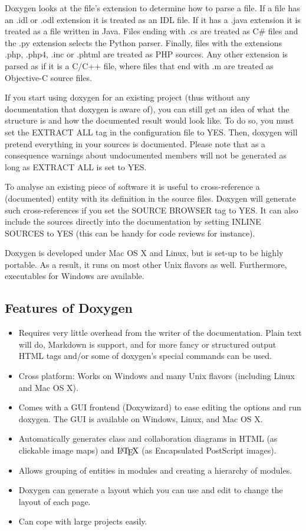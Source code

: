 Doxygen looks at the file’s extension to determine how to parse a file. If a file has an .idl or .odl extension it is treated as an IDL file. If it has a .java extension it is treated as a file written in Java. Files ending with .cs are treated as C\# files and the .py extension selects the Python parser. Finally, files with the extensions .php, .php4, .inc or .phtml are treated as PHP sources. Any other extension is parsed as if it is a C/C++ file, where files that end with .m are treated as Objective-C source files.

If you start using doxygen for an existing project (thus without any documentation that doxygen is aware of), you can still get an idea of what the structure is and how the documented result would look like. To do so, you must set the EXTRACT ALL tag in the configuration file to YES. Then, doxygen will pretend everything in your sources is documented. Please note that as a consequence warnings about undocumented members will not be generated as long as EXTRACT ALL is set to YES.

To analyse an existing piece of software it is useful to cross-reference a (documented) entity with its definition in the source files. Doxygen will generate such cross-references if you set the SOURCE BROWSER tag to YES. It can also include the sources directly into the documentation by setting INLINE SOURCES to YES (this can be handy for code reviews for instance).

Doxygen is developed under Mac OS X and Linux, but is set-up to be highly portable. As a result, it runs on most other Unix flavors as well. Furthermore, executables for Windows are available.

\subsection{Features of Doxygen}
\begin{itemize}
	\item Requires very little overhead from the writer of the documentation. 
	Plain text will do, Markdown is support, and for more fancy or structured 
	output HTML tags and/or some of doxygen's special commands can be used.
	\item Cross platform: Works on Windows and many Unix flavors (including 
	Linux and Mac OS X).
	\item Comes with a GUI frontend (Doxywizard) to ease editing the options 
	and run doxygen. The GUI is available on Windows, Linux, and Mac OS X.
	\item Automatically generates class and collaboration diagrams in HTML 
	(as clickable image maps) and $\mbox{\LaTeX}$ (as Encapsulated PostScript 
	images).
	\item Allows grouping of entities in modules and creating a hierarchy 
	of modules.
	\item Doxygen can generate a layout which you can use and edit to change 
	the layout of each page.
	\item Can cope with large projects easily.
\end{itemize}
